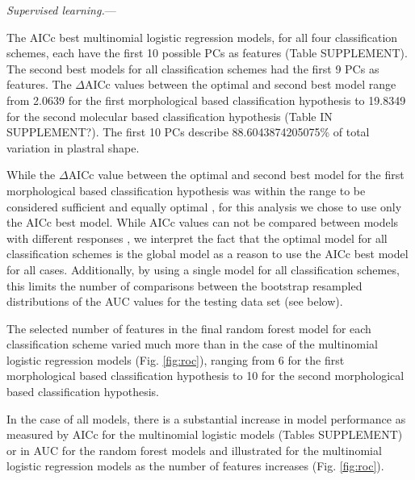 \documentclass[12pt,letterpaper]{article}\usepackage{graphicx, color}
\renewcommand{\subsubsection}[1]{%
\vspace{2ex}
\noindent
\textit{#1.}---}
\begin{document}
\subsubsection{Supervised learning}


The AICc best multinomial logistic regression models, for all four classification schemes, each have the first 10 possible PCs as features (Table SUPPLEMENT). The second best models for all classification schemes had the first 9 PCs as features. The \(\Delta\)AICc values between the optimal and second best model range from 2.0639 for the first morphological based classification hypothesis to 19.8349 for the second molecular based classification hypothesis (Table IN SUPPLEMENT?). The first 10 PCs describe 88.6043874205075\% of total variation in plastral shape.

While the \(\Delta\)AICc value between the optimal and second best model for the first morphological based classification hypothesis was within the range to be considered sufficient and equally optimal \citep{Burnham2002a}, for this analysis we chose to use only the AICc best model. While AICc values can not be compared between models with different responses \citep{Burnham2002a}, we interpret the fact that the optimal model for all classification schemes is the global model as a reason to use the AICc best model for all cases. Additionally, by using a single model for all classification schemes, this limits the number of comparisons between the bootstrap resampled distributions of the AUC values for the testing data set (see below).




The selected number of features in the final random forest model for each classification scheme varied much more than in the case of the multinomial logistic regression models (Fig. \ref{fig:roc}), ranging from 6 for the first morphological based classification hypothesis to 10 for the second morphological based classification hypothesis. 


In the case of all models, there is a substantial increase in model performance as measured by AICc for the multinomial logistic models (Tables SUPPLEMENT) or in AUC for the random forest models and illustrated for the multinomial logistic regression models as the number of features increases (Fig. \ref{fig:roc}). 
\end{document}
